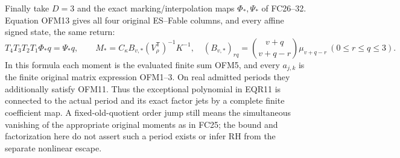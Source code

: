 Finally take $D=3$ and the exact marking/interpolation maps
$\Phi_*,\Psi_*$ of FC26--32. Equation OFM13 gives all four original
ES--Fable columns, and every affine signed state, the same return:
\[
 T_4T_3T_2T_1\Phi_*q=\Psi_*q,\qquad
 M_*=C_\kappa B_{v,*}(V_\rho^{\mathsf T})^{-1}K^{-1},
 \quad (B_{v,*})_{r q}=\binom{v+q}{v+q-r}\mu_{v+q-r}
 \ (0\le r\le q\le3).
 \tag{OFM17}
\]
In this formula each moment is the evaluated finite sum OFM5, and
every $a_{j,k}$ is the finite original matrix expression OFM1--3.
On real admitted periods they additionally satisfy OFM11.
Thus the exceptional polynomial in EQR11 is connected to the actual
period and its exact factor jets by a complete finite coefficient
map. A fixed-old-quotient order jump still means the simultaneous
vanishing of the appropriate original moments as in FC25; the bound
and factorization here do not assert such a period exists or infer
RH from the separate nonlinear escape.
